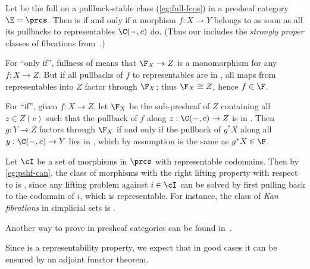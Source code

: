 \begin{eg}\label{eg:pshf-can}
  Let \F be the full \nfs on a pullback-stable class (\cref{eg:full-fcos}) in a presheaf category $\E=\prcs$.
  Then \F is \local if and only if a morphism $f:X\to Y$ belongs to \F as soon as all its pullbacks to representables $\C(-,c)$ do.
  (Thus our \locality includes the \emph{strongly proper} classes of fibrations from~\cite[Definition 3.7]{cisinski:elegant}.)

  For ``only if'', fullness of \F means that $\F_X\to Z$ is a monomorphism for any $f:X\to Z$.
  But if all pullbacks of $f$ to representables are in \F, all maps from representables into $Z$ factor through $\F_X$; thus $\F_X\cong Z$, hence $f\in \F$.

  For ``if'', given $f:X\to Z$, let $\F_X$ be the sub-presheaf of $Z$ containing all $z\in Z(c)$ such that the pullback of $f$ along $z:\C(-,c)\to Z$ is in \F.
  Then $g:Y\to Z$ factors through $\F_X$ if and only if the pullback of $g^*X$ along all $y:\C(-,c) \to Y$ lies in \F, which by assumption is the same as $g^*X \in \F$.
\end{eg}

\begin{eg}\label{eg:rep-cod}
  Let $\cI$ be a set of morphisms in $\prcs$ with representable codomains.
  Then by \cref{eg:pshf-can}, the class of morphisms with the right lifting property with respect to \cI is \local, since any lifting problem against $i\in \cI$ can be solved by first pulling back to the codomain of $i$, which is representable.
  For instance, %
  the class of \emph{Kan fibrations} in simplicial sets is \local.

  Another way to prove \locality in presheaf categories can be found in~\cite[Theorem 3.14]{cisinski:elegant}.
\end{eg}


Since \locality is a representability property, we expect that in good cases it can be ensured by an adjoint functor theorem.

